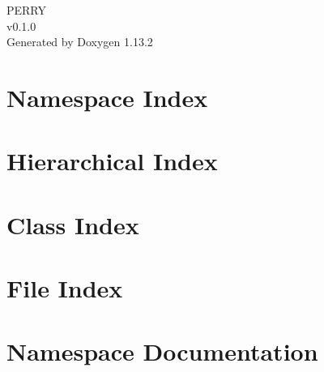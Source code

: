 \documentclass[twoside]{book}
\newcommand{\+}{\discretionary{\mbox{\scriptsize$\hookleftarrow$}}{}{}}
\newcommand{\clearemptydoublepage}{%
    \newpage{\pagestyle{empty}\cleardoublepage}%
  }
\begin{document}
  \raggedbottom
    \hypersetup{pageanchor=false,
                bookmarksnumbered=true,
                pdfencoding=unicode
               }
  \begin{titlepage}
  \vspace*{7cm}
  \begin{center}%
  {\Large PERRY}\\
  [1ex]\large v0.\+1.\+0 \\
  \vspace*{1cm}
  {\large Generated by Doxygen 1.13.2}\\
  \end{center}
  \end{titlepage}
  \clearemptydoublepage
  \tableofcontents
  \clearemptydoublepage
  \hypersetup{pageanchor=true}

\chapter{Namespace Index}

\chapter{Hierarchical Index}

\chapter{Class Index}

\chapter{File Index}

\chapter{Namespace Documentation}



\end{document}
